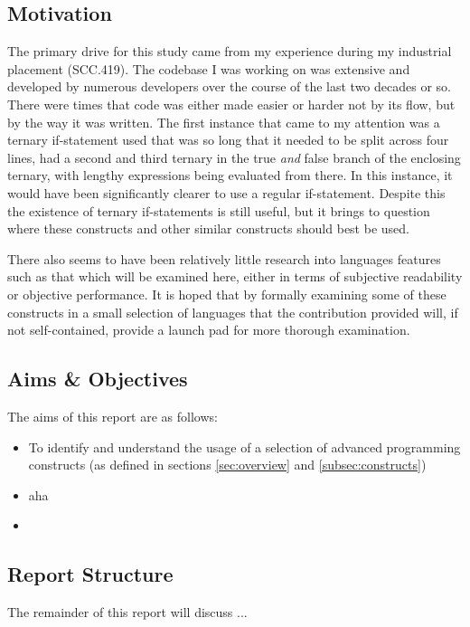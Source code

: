 \documentclass{article}
\begin{document}
    \subsection{Motivation}
        The primary drive for this study came from my experience during my industrial placement (SCC.419). The codebase I was working on was extensive and developed by numerous developers over the course of the last two decades or so. There were times that code was either made easier or harder not by its flow, but by the way it was written. The first instance that came to my attention was a ternary if-statement used that was so long that it needed to be split across four lines, had a second and third ternary in the true \emph{and} false branch of the enclosing ternary, with lengthy expressions being evaluated from there. In this instance, it would have been significantly clearer to use a regular if-statement. Despite this the existence of ternary if-statements is still useful, but it brings to question where these constructs and other similar constructs should best be used.

        There also seems to have been relatively little research into languages features such as that which will be examined here, either in terms of subjective readability or objective performance. It is hoped that by formally examining some of these constructs in a small selection of languages that the contribution provided will, if not self-contained, provide a launch pad for more thorough examination.
    \subsection{Aims \& Objectives}
        The aims of this report are as follows:
        \begin{itemize}
            \item To identify and understand the usage of a selection of advanced programming constructs (as defined in sections \ref{sec:overview} and \ref{subsec:constructs})
            \item aha
            \item 
        \end{itemize}
    \subsection{Report Structure}
        The remainder of this report will discuss ...
\newpage
\end{document}
